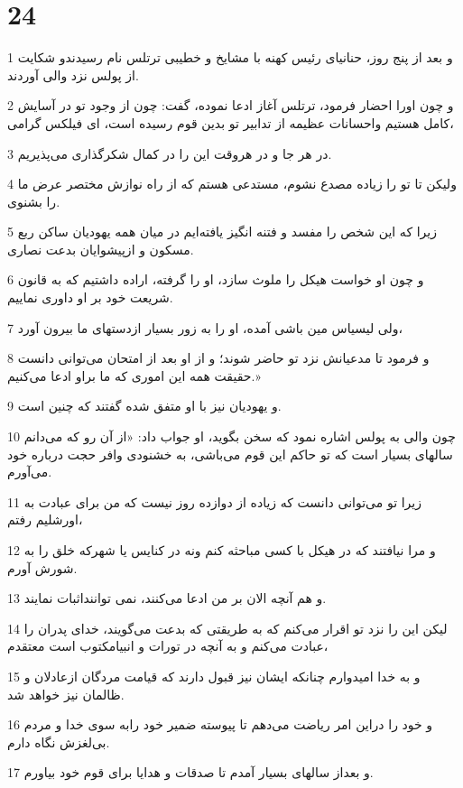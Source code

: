 \chapter{24}

\par 1 و بعد از پنج روز، حنانیای رئیس کهنه با مشایخ و خطیبی ترتلس نام رسیدندو شکایت از پولس نزد والی آوردند.
\par 2 و چون اورا احضار فرمود، ترتلس آغاز ادعا نموده، گفت: چون از وجود تو در آسایش کامل هستیم واحسانات عظیمه از تدابیر تو بدین قوم رسیده است، ای فیلکس گرامی،
\par 3 در هر جا و در هروقت این را در کمال شکرگذاری می‌پذیریم.
\par 4 ولیکن تا تو را زیاده مصدع نشوم، مستدعی هستم که از راه نوازش مختصر عرض ما را بشنوی.
\par 5 زیرا که این شخص را مفسد و فتنه انگیز یافته‌ایم در میان همه یهودیان ساکن ربع مسکون و ازپیشوایان بدعت نصاری.
\par 6 و چون او خواست هیکل را ملوث سازد، او را گرفته، اراده داشتیم که به قانون شریعت خود بر او داوری نماییم.
\par 7 ولی لیسیاس مین باشی آمده، او را به زور بسیار ازدستهای ما بیرون آورد،
\par 8 و فرمود تا مدعیانش نزد تو حاضر شوند؛ و از او بعد از امتحان می‌توانی دانست حقیقت همه این اموری که ما براو ادعا می‌کنیم.»
\par 9 و یهودیان نیز با او متفق شده گفتند که چنین است.
\par 10 چون والی به پولس اشاره نمود که سخن بگوید، او جواب داد: «از آن رو که می‌دانم سالهای بسیار است که تو حاکم این قوم می‌باشی، به خشنودی وافر حجت درباره خود می‌آورم.
\par 11 زیرا تو می‌توانی دانست که زیاده از دوازده روز نیست که من برای عبادت به اورشلیم رفتم،
\par 12 و مرا نیافتند که در هیکل با کسی مباحثه کنم ونه در کنایس یا شهر‌که خلق را به شورش آورم.
\par 13 و هم آنچه الان بر من ادعا می‌کنند، نمی تواننداثبات نمایند.
\par 14 لیکن این را نزد تو اقرار می‌کنم که به طریقتی که بدعت می‌گویند، خدای پدران را عبادت می‌کنم و به آنچه در تورات و انبیامکتوب است معتقدم،
\par 15 و به خدا امیدوارم چنانکه ایشان نیز قبول دارند که قیامت مردگان ازعادلان و ظالمان نیز خواهد شد.
\par 16 و خود را دراین امر ریاضت می‌دهم تا پیوسته ضمیر خود رابه سوی خدا و مردم بی‌لغزش نگاه دارم.
\par 17 و بعداز سالهای بسیار آمدم تا صدقات و هدایا برای قوم خود بیاورم.
